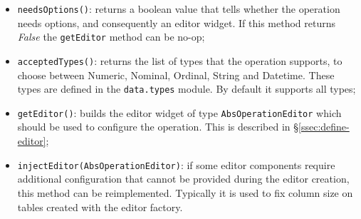 \begin{itemize}
	\item \texttt{needsOptions()}: returns a boolean value that tells whether the operation needs options, and consequently an editor widget. If this method returns \textit{False} the \texttt{getEditor} method can be no-op;
	\item \texttt{acceptedTypes()}: returns the list of types that the operation supports, to choose between Numeric, Nominal, Ordinal, String and Datetime. These types are defined in the \texttt{data.types} module. By default it supports all types;
	\item \texttt{getEditor()}: builds the editor widget of type \texttt{AbsOperationEditor} which should be used to configure the operation. This is described in §\ref{ssec:define-editor};
	\item \texttt{injectEditor(AbsOperationEditor)}: if some editor components require additional configuration that cannot be provided during the editor creation, this method can be reimplemented. Typically it is used to fix column size on tables created with the editor factory.
\end{itemize}

